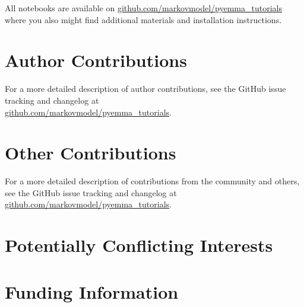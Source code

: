 \documentclass[9pt,tutorial]{livecoms}
\newcommand{\githubrepository}{\url{github.com/markovmodel/pyemma_tutorials}}
\begin{document}
All notebooks are available on \githubrepository{} where you also might find additional materials and installation instructions.


\section{Author Contributions}
%
For a more detailed description of author contributions, see the GitHub issue tracking and changelog at\\\githubrepository{}.

\section{Other Contributions}
%
For a more detailed description of contributions from the community and others, see the GitHub issue tracking and changelog at \githubrepository{}.

\section{Potentially Conflicting Interests}

\section{Funding Information}




\end{document}
